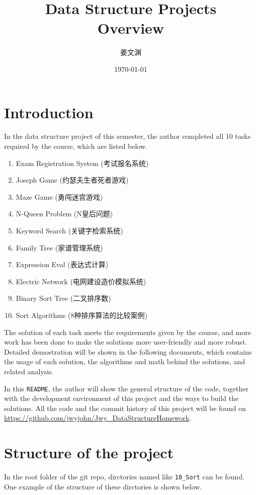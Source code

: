 \documentclass[cn,black,12pt,normal]{elegantnote}
\title{Data Structure Projects\\Overview}
\author{姜文渊}
\institute{School of Software Engineering, Tongji University}
\date{\today}
\begin{document}
\maketitle

\section{Introduction}

In the data structure project of this semester, the author completed all 10 tasks required by the course, which are listed below.

\begin{enumerate}
    \item Exam Registration System (考试报名系统)
    \item Joseph Game (约瑟夫生者死者游戏)
    \item Maze Game (勇闯迷宫游戏)
    \item N-Queen Problem (N皇后问题)
    \item Keyword Search (关键字检索系统)
    \item Family Tree (家谱管理系统)
    \item Expression Eval (表达式计算)
    \item Electric Network (电网建设造价模拟系统)
    \item Binary Sort Tree (二叉排序数)
    \item Sort Algorithms (8种排序算法的比较案例)
\end{enumerate}

The solution of each task meets the requirements given by the course, and more work has been done to make the solutions more user-friendly and more robust. Detailed demostration will be shown in the following documents, which contains the usage of each solution, the algorithms and math behind the solutions, and related analysis.

In this \lstinline{README}, the author will show the general structure of the code, together with the development environment of this project and the ways to build the solutions. All the code and the commit history of this project will be found on \url{https://github.com/jwyjohn/Jwy_DataStructureHomework}.

\section{Structure of the project}

In the root folder of the git repo, dirctories named like \lstinline{10_Sort} can be found. One example of the structure of these dirctories is shown below.
\end{document}
